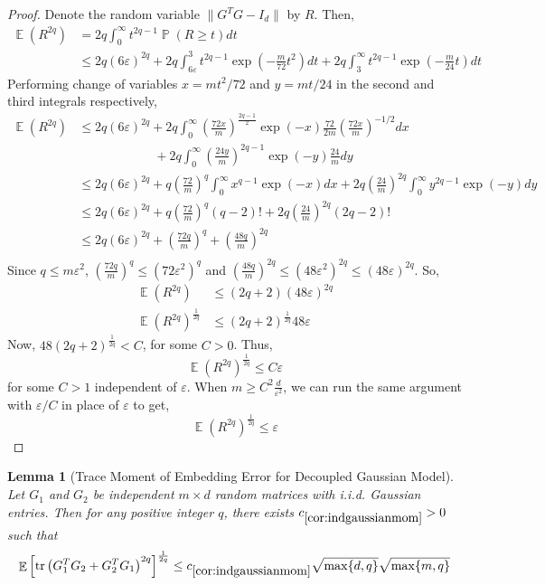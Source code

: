 \documentclass[11pt]{amsart}
\numberwithin{equation}{section}
\numberwithin{equation}{section}
\DeclareMathOperator{\E}{\mathbb{E}}
\DeclareMathOperator{\Pb}{\mathbb{P}}
\DeclareMathOperator*{\tr}{tr}
\newtheorem{lemma}[theorem]{Lemma}
\theoremstyle{remark}
\theoremstyle{definition}
\begin{document}
\begin{proof}
Denote the random variable $\| G^TG - I_d \|$ by $R$. Then,
\begin{align*}
    \E (R^{2q}) &= 2q \int_0^\infty t^{2q-1}\Pb(R \ge t) dt \\
    &\le 2q(6\varepsilon)^{2q} + 2q \int_{6\varepsilon}^3 t^{2q-1}\exp(-\frac{m}{72} t^2) dt + 2q \int_{3}^\infty t^{2q-1}\exp(-\frac{m}{24} t) dt
\end{align*}
Performing change of variables $x = mt^2/72$ and $y = mt/24$ in the second and third integrals respectively,
\begin{align*}
    \E (R^{2q}) &\le 2q(6\varepsilon)^{2q} + 2q \int_{0}^\infty \left(\frac{72x}{m} \right)^\frac{2q-1}{2}\exp(-x) \frac{72}{2m}\left(\frac{72x}{m} \right)^{-1/2}  dx \\ &\qquad \qquad \qquad + 2q \int_{0}^\infty \left(\frac{24y}{m} \right)^{2q-1}\exp(-y) \frac{24}{m} dy \\
    &\le 2q(6\varepsilon)^{2q} + q \left(\frac{72}{m} \right)^q \int_{0}^\infty x^{q-1}\exp(-x) dx + 2q \left(\frac{24}{m} \right)^{2q} \int_{0}^\infty y^{2q-1}\exp(-y) dy \\
    &\le 2q(6\varepsilon)^{2q} + q \left(\frac{72}{m} \right)^q (q-2)! + 2q \left(\frac{24}{m} \right)^{2q} (2q-2)! \\
    &\le 2q(6\varepsilon)^{2q} +  \left(\frac{72q}{m} \right)^q + \left(\frac{48q}{m} \right)^{2q} \\
\end{align*}
Since $q \le m\varepsilon^2 $,  $\left(\frac{72q}{m} \right)^q \le  \left(72 \varepsilon^2 \right)^{q}$ and $\left(\frac{48q}{m} \right)^{2q} \le  \left(48 \varepsilon^2 \right)^{2q} \le  \left(48 \varepsilon \right)^{2q} $. So,
\begin{align*}
    \E (R^{2q}) &\le (2q+2 )(48\varepsilon)^{2q} \\
    \E (R^{2q})^\frac{1}{2q} &\le (2q+2 )^\frac{1}{2q} 48\varepsilon 
\end{align*}
Now, $48(2q+2 )^\frac{1}{2q} < C$, for some $C>0$. Thus,
\[ \E (R^{2q})^\frac{1}{2q} \le C\varepsilon \]
for some $C > 1$ independent of $\varepsilon$. When $m \ge C^2\frac{d}{\varepsilon^2}$, we can run the same argument with $\varepsilon/C$ in place of $\varepsilon$ to get, 
\[ \E (R^{2q})^\frac{1}{2q} \le \varepsilon \]

\end{proof} 



\begin{lemma}[Trace Moment of Embedding Error for Decoupled Gaussian Model]\label{cor:indgaussianmom}
    Let $G_1$ and $G_2$ be independent $m \times d$ random matrices with i.i.d. Gaussian entries. Then for any positive integer $q$, there exists $c_{\ref*{cor:indgaussianmom}}>0$ such that 
    \[ \E \left[ \tr \left( G_1^TG_2 + G_2^TG_1 \right)^{2q} \right]^\frac{1}{2q} \le c_{\ref*{cor:indgaussianmom}}\sqrt{\max\{d, q\}}\sqrt{\max\{m, q\}}\]
    
\end{lemma}
\end{document}
